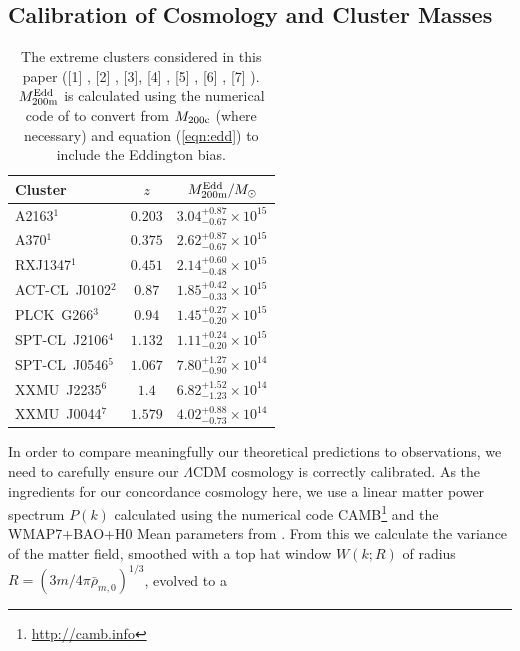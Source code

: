 \documentclass[twocolumn,useAMS,usenatbib,usegraphicx]{mn2e}
\newcommand{\lcdm}{$\Lambda$CDM }
\begin{document}
\subsection{Calibration of Cosmology and Cluster Masses}
\begin{table}
\label{tab:clusters}
\begin{center}
\begin{tabular}{lcc} \hline
Cluster & $z$ & $M_{200\rm m}^{\rm Edd}/M_\odot$  \\
\hline
A2163$^{1}$ & $0.203$ & $3.04_{-0.67}^{+0.87}\times 10^{15}$  \\
A370$^{1}$ & $0.375$ & $2.62_{-0.67}^{+0.87}\times 10^{15}$ \\
RXJ1347$^{1}$ & $0.451$ & $2.14_{-0.48}^{+0.60}\times 10^{15}$  \\
ACT-CL~J0102$^{2}$  & $0.87$ & $1.85_{-0.33}^{+0.42}\times 10^{15}$ \\
PLCK~G266$^{3}$ & $0.94$ & $1.45^{+0.27}_{-0.20}\times 10^{15}$  \\
SPT-CL~J2106$^{4}$  & $1.132$ & $1.11_{-0.20}^{+0.24}\times 10^{15}$  \\
SPT-CL~J0546$^{5}$ & $1.067$ & $7.80^{+1.27}_{-0.90}\times 10^{14}$ \\
XXMU~J2235$^{6}$  & $1.4$ & $6.82_{-1.23}^{+1.52}\times 10^{14}$   \\
XXMU~J0044$^{7}$  & $1.579$ & $4.02_{-0.73}^{+0.88}\times 10^{14}$  \\
\hline
\end{tabular}
\end{center}
\caption{The extreme clusters considered in this paper ([1]
\citealt{Maughan2011}, [2] \citealt{Marriage2011a},
[3]\citealt{PlanckCollaboration2011}, [4] \citealt{Foley2011}, [5]
\citealt{Brodwin2010}, [6] \citealt{Jee2009a}, [7]
\citealt{Santos2011}). $M_{200\rm m}^{\rm Edd}$ is calculated using
the numerical code of \citep{Zhao2009} to convert from $M_{200\rm
c}$ (where necessary) and equation (\ref{eqn:edd}) to include the
Eddington bias.}
\end{table}
In order to  compare meaningfully our theoretical predictions to
observations, we need to carefully ensure our \lcdm cosmology is
correctly calibrated. As the ingredients for our concordance
cosmology here, we use a linear matter power spectrum $P(k)$
calculated using the numerical code
CAMB\footnote{\url{http://camb.info}} and the WMAP7+BAO+H0 Mean
parameters from \cite{Komatsu2011n}. From this we calculate the
variance of the matter field, smoothed with a top hat window $W(k;
R)$ of radius $R=(3m/4\pi\bar{\rho}_{m,0})^{1/3}$, evolved to a
\end{document}
